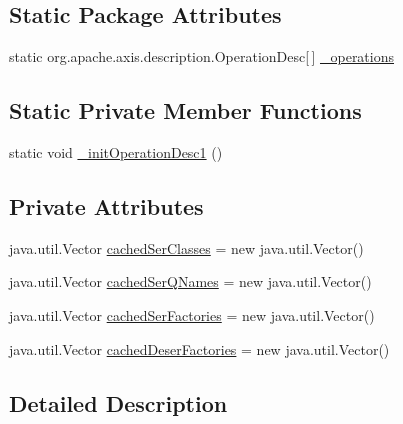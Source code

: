 \subsection*{Static Package Attributes}
\begin{DoxyCompactItemize}
\item 
static org.apache.axis.description.OperationDesc\mbox{[}$\,$\mbox{]} \hyperlink{classorg_1_1glite_1_1security_1_1voms_1_1service_1_1acl_1_1VOMSACLSoapBindingStub_a62f5bc542d4ef6fe5ac95163e7ccb066}{\_\-operations}
\end{DoxyCompactItemize}
\subsection*{Static Private Member Functions}
\begin{DoxyCompactItemize}
\item 
static void \hyperlink{classorg_1_1glite_1_1security_1_1voms_1_1service_1_1acl_1_1VOMSACLSoapBindingStub_a2c94146b421b81e9427fbf72b88eb7f7}{\_\-initOperationDesc1} ()
\end{DoxyCompactItemize}
\subsection*{Private Attributes}
\begin{DoxyCompactItemize}
\item 
java.util.Vector \hyperlink{classorg_1_1glite_1_1security_1_1voms_1_1service_1_1acl_1_1VOMSACLSoapBindingStub_a82236f77a34615d37767ccf05dd107e3}{cachedSerClasses} = new java.util.Vector()
\item 
java.util.Vector \hyperlink{classorg_1_1glite_1_1security_1_1voms_1_1service_1_1acl_1_1VOMSACLSoapBindingStub_a9a88669798594a57c1984913ab629a8b}{cachedSerQNames} = new java.util.Vector()
\item 
java.util.Vector \hyperlink{classorg_1_1glite_1_1security_1_1voms_1_1service_1_1acl_1_1VOMSACLSoapBindingStub_aa514a226d14f7fdd2a0f98672de1d023}{cachedSerFactories} = new java.util.Vector()
\item 
java.util.Vector \hyperlink{classorg_1_1glite_1_1security_1_1voms_1_1service_1_1acl_1_1VOMSACLSoapBindingStub_ad2a0f0464874ed1a4f61fd2226c64342}{cachedDeserFactories} = new java.util.Vector()
\end{DoxyCompactItemize}


\subsection{Detailed Description}


